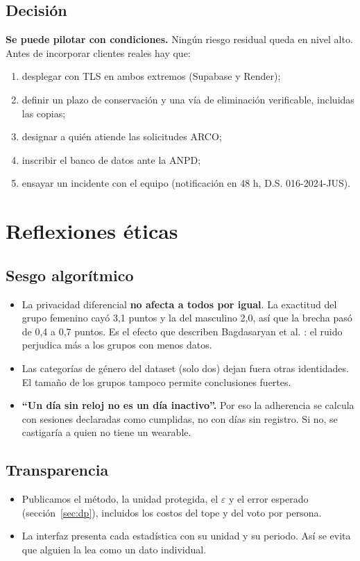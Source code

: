 \documentclass[11pt]{article}
\begin{document}
\subsection{Decisión}
\textbf{Se puede pilotar con condiciones.} Ningún riesgo residual queda en nivel alto. Antes de incorporar clientes reales hay que:
\begin{enumerate}[nosep]
  \item desplegar con TLS en ambos extremos (Supabase y Render);
  \item definir un plazo de conservación y una vía de eliminación verificable, incluidas las copias;
  \item designar a quién atiende las solicitudes ARCO;
  \item inscribir el banco de datos ante la ANPD;
  \item ensayar un incidente con el equipo (notificación en 48 h, D.S. 016-2024-JUS).
\end{enumerate}

\section{Reflexiones éticas}

\subsection*{Sesgo algorítmico}
\begin{itemize}[nosep]
  \item La privacidad diferencial \textbf{no afecta a todos por igual}. La exactitud del grupo femenino cayó 3,1 puntos y la del masculino 2,0, así que la brecha pasó de 0,4 a 0,7 puntos. Es el efecto que describen Bagdasaryan et al. \cite{bagdasaryan2019}: el ruido perjudica más a los grupos con menos datos.
  \item Las categorías de género del dataset (solo dos) dejan fuera otras identidades. El tamaño de los grupos tampoco permite conclusiones fuertes.
  \item \textbf{``Un día sin reloj no es un día inactivo''.} Por eso la adherencia se calcula con sesiones declaradas como cumplidas, no con días sin registro. Si no, se castigaría a quien no tiene un wearable.
\end{itemize}

\subsection*{Transparencia}
\begin{itemize}[nosep]
  \item Publicamos el método, la unidad protegida, el $\varepsilon$ y el error esperado (sección~\ref{sec:dp}), incluidos los costos del tope y del voto por persona.
  \item La interfaz presenta cada estadística con su unidad y su periodo. Así se evita que alguien la lea como un dato individual.
\end{itemize}
\end{document}
